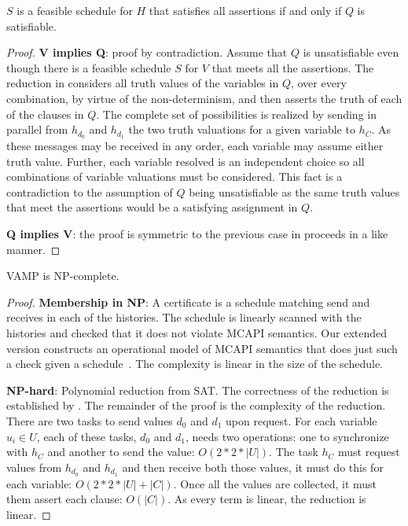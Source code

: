 \begin{lemma} \label{lem:sat}
$S$ is a feasible schedule for $H$ that satisfies all assertions if
  and only if $Q$ is satisfiable.
\end{lemma}
\begin{proof}
\textbf{V implies Q}: proof by contradiction. Assume that $Q$ is
unsatisfiable even though there is a feasible schedule $S$ for $V$
that meets all the assertions. The reduction in 
considers all truth values of the variables in $Q$, over every
combination, by virtue of the non-determinism, and then asserts the
truth of each of the clauses in $Q$. The complete set of possibilities
is realized by sending in parallel from $h_{d_0}$ and $h_{d_1}$ the
two truth valuations for a given variable to $h_C$. As these messages
may be received in any order, each variable may assume either truth
value. Further, each variable resolved is an independent choice so all
combinations of variable valuations must be considered.  This fact is
a contradiction to the assumption of $Q$ being unsatisfiable as the
same truth values that meet the assertions would be a satisfying
assignment in $Q$.

\noindent \textbf{Q implies V}: the proof is symmetric to the previous case in
proceeds in a like manner.
\end{proof}

\begin{theorem}[NP-complete]
VAMP is NP-complete.
\end{theorem}
\begin{proof}
\noindent\textbf{Membership in NP}: A certificate is a schedule
matching send and receives in each of the histories. The schedule is
linearly scanned with the histories and checked that it does not
violate MCAPI semantics. Our extended version constructs an
operational model of MCAPI semantics that does just such a check given
a schedule~\cite{extended-version}. The complexity is linear in the
size of the schedule.

\noindent\textbf{NP-hard}: Polynomial reduction from SAT. The
correctness of the reduction is established by .
The remainder of the proof is the complexity of the reduction. There
are two tasks to send values $d_0$ and $d_1$ upon request. For each
variable $u_i \in U$, each of these tasks, $d_0$ and $d_1$, needs two
operations: one to synchronize with $h_C$ and another to send the
value: $O(2 * 2 * |U|)$. The task $h_C$ must request values from
$h_{d_0}$ and $h_{d_1}$ and then receive both those values, it must do
this for each variable: $O(2 * 2 * |U| + |C|)$.  Once all the values
are collected, it must them assert each clause: $O(|C|)$. As every
term is linear, the reduction is linear.
\end{proof}
